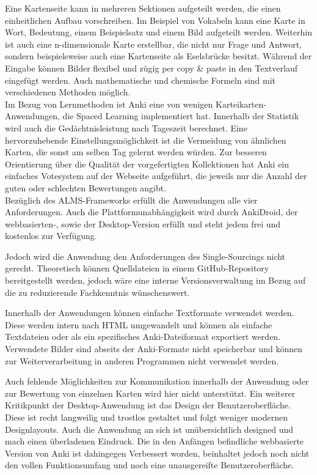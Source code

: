 Eine Kartenseite kann in mehreren Sektionen aufgeteilt werden, die einen einheitlichen Aufbau vorschreiben. Im Beispiel von Vokabeln kann eine Karte in Wort, Bedeutung, einem Beispielsatz und einem Bild aufgeteilt werden. Weiterhin ist auch eine n-dimensionale Karte erstellbar, die nicht nur Frage und Antwort, sondern beispielsweise auch eine Kartenseite als Eselsbrücke besitzt.  
Während der Eingabe können Bilder flexibel und zügig per copy {\&} paste in den Textverlauf eingefügt werden. Auch mathematische und chemische Formeln sind mit verschiedenen Methoden möglich. \\

Im Bezug von Lernmethoden ist Anki eine von wenigen Karteikarten-Anwendungen, die Spaced Learning implementiert hat. Innerhalb der Statistik wird auch die Gedächtnisleistung nach Tageszeit berechnet. Eine hervorzuhebende Einstellungsmöglichkeit ist die Vermeidung von ähnlichen Karten, die sonst am selben Tag gelernt werden würden. Zur besseren Orientierung über die Qualität der vorgefertigten Kollektionen hat Anki ein einfaches Votesystem auf der Webseite aufgeführt, die jeweils nur die Anzahl der guten oder schlechten Bewertungen angibt. \\

Bezüglich des ALMS-Frameworks erfüllt die Anwendungen alle vier Anforderungen. Auch die Plattformunabhängigkeit wird durch AnkiDroid, der webbasierten-, sowie der Desktop-Version erfüllt und steht jedem frei und kostenlos zur Verfügung.

Jedoch wird die Anwendung den Anforderungen des Single-Sourcings nicht gerecht. Theoretisch können Quelldateien in einem GitHub-Repository bereitgestellt werden, jedoch wäre eine interne Versionsverwaltung im Bezug auf die zu reduzierende Fachkenntnis wünschenswert.

Innerhalb der Anwendungen können einfache Textformate verwendet werden. Diese werden intern nach HTML umgewandelt und können als einfache Textdateien oder als ein spezifisches Anki-Dateiformat exportiert werden. Verwendete Bilder sind abseits der Anki-Formate nicht speicherbar und können zur Weiterverarbeitung in anderen Programmen nicht verwendet werden.

Auch fehlende Möglichkeiten zur Kommunikation innerhalb der Anwendung oder zur Bewertung von einzelnen Karten wird hier nicht unterstützt. Ein weiterer Kritikpunkt der Desktop-Anwendung ist das Design der Benutzeroberfläche. Diese ist recht langweilig und trostlos gestaltet und folgt weniger modernen Designlayouts. Auch die Anwendung an sich ist unübersichtlich designed und mach einen überladenen Eindruck. Die in den Anfängen befindliche webbasierte Version von Anki ist dahingegen Verbessert worden, beinhaltet jedoch noch nicht den vollen Funktionsumfang und noch eine unausgereifte Benutzeroberfläche. \\


